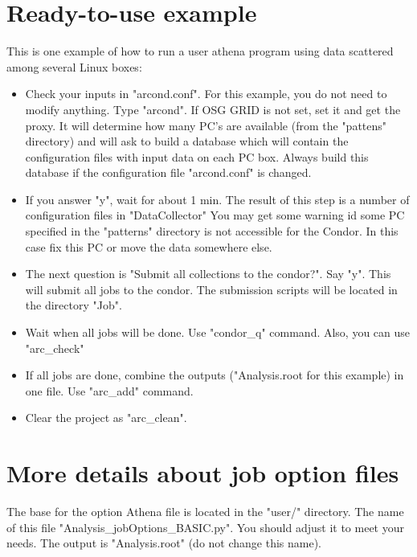 \documentclass[a4paper]{book}
\begin{document}
 

\section{Ready-to-use example}
This is one example of how to run a user athena program using data scattered among several
Linux boxes:

\begin{itemize}
\item
Check your inputs in "arcond.conf". For this example, you do not need to modify anything.
Type "arcond". If OSG GRID is not set, set it and get the proxy.
It will determine how many PC's are available (from the "pattens" directory) and will ask
to build a database which will contain the configuration files with input data on each PC box.
Always build this database if the configuration file "arcond.conf" is changed. 

\item
If you answer "y", wait for about 1 min.   
The result of this step is a number of configuration files in "DataCollector" 
You may get some warning id some PC specified in the "patterns" directory is
not accessible for the Condor. In this case fix this PC or move the data somewhere else. 

\item
The next question is "Submit all collections to the condor?". Say "y".
This will submit all jobs to the condor.
The submission scripts will be located in the directory "Job".

\item
Wait when all jobs will be done. Use "condor\_q" command. Also, you can use "arc\_check" 

\item
If all jobs are done, combine the outputs ("Analysis.root for this example) in one file.
Use "arc\_add" command. 

\item
Clear the project as "arc\_clean".


\end{itemize}


\section{More details about job option files}

The base for the option Athena  file is located in the "user/" directory. The name of this file
"Analysis\_jobOptions\_BASIC.py". You should adjust it to meet your needs.
The output is "Analysis.root" (do not change this name).
\end{document}
